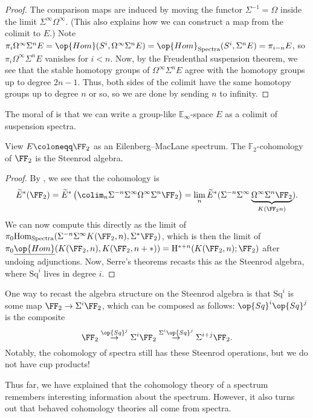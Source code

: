 \documentclass[../notes.tex]{subfiles}
\begin{document}
\begin{proof}
	The comparison maps are induced by moving the functor $\Sigma^{-1}=\Omega$ inside the limit $\Sigma^\infty\Omega^\infty$. (This also explains how we can construct a map from the colimit to $E$.) Note $\pi_i\Omega^\infty\Sigma^nE=\op{Hom}(S^i,\Omega^\infty\Sigma^nE)=\op{Hom}_{\mathrm{Spectra}}(S^i,\Sigma^nE)=\pi_{i-n}E$, so $\pi_i\Omega^\infty\Sigma^nE$ vanishes for $i<n$. Now, by the Freudenthal suspension theorem, we see that the stable homotopy groups of $\Omega^\infty\Sigma^nE$ agree with the homotopy groups up to degree $2n-1$. Thus, both sides of the colimit have the same homotopy groups up to degree $n$ or so, so we are done by sending $n$ to infinity.
\end{proof}
\begin{remark}
	The moral of  is that we can write a group-like $\mathbb E_\infty$-space $E$ as a colimit of suspension spectra.
\end{remark}
\begin{example}
	View $E\coloneqq\FF_2$ as an Eilenberg--MacLane spectrum. The $\mathbb F_2$-cohomology of $\FF_2$ is the Steenrod algebra.
\end{example}
\begin{proof}
	By , we see that the cohomology is
	\[\widetilde E^*(\FF_2)=\widetilde E^*\left(\colim_n\Sigma^{-n}\Sigma^\infty\Omega^\infty\Sigma^n\FF_2\right)=\lim_n\widetilde E^*(\Sigma^{-n}\Sigma^\infty\underbrace{\Omega^\infty\Sigma^n\FF_2}_{K(\FF_2n)}).\]
	We can now compute this directly as the limit of $\pi_0\mathrm{Hom}_{\mathrm{Spectra}}(\Sigma^{-n}\Sigma^\infty K(\FF_2,n),\Sigma^*\FF_2)$, which is then the limit of $\pi_0\underline{\op{Hom}}(K(\FF_2,n),K(\FF_2,n+*))=\mathrm H^{*+n}(K(\FF_2,n);\FF_2)$ after undoing adjunctions. Now, Serre's theorems recasts this as the Steenrod algebra, where $\mathrm{Sq}^i$ lives in degree $i$.
\end{proof}
\begin{remark}
	One way to recast the algebra structure on the Steenrod algebra is that $\mathrm{Sq}^i$ is some map $\FF_2\to\Sigma^i\FF_2$, which can be composed as follows: $\op{Sq}^i\op{Sq}^j$ is the composite
	\[\FF_2\stackrel{\op{Sq}^j}\to\Sigma^i\FF_2\stackrel{\Sigma^i\op{Sq}^j}\to\Sigma^{i+j}\FF_2.\]
	Notably, the cohomology of spectra still has these Steenrod operations, but we do not have cup products!
\end{remark}
Thus far, we have explained that the cohomology theory of a spectrum remembers interesting information about the spectrum. However, it also turns out that behaved cohomology theories all come from spectra.
\end{document}

